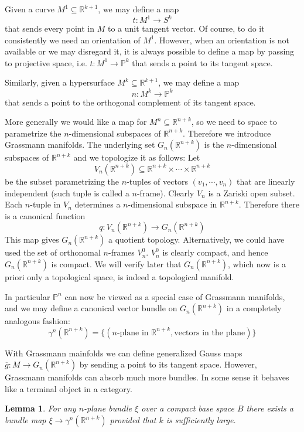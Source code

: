 \documentclass[12pt]{article}
\theoremstyle{plain}
\newtheorem{lemma}[equation]{Lemma}
\theoremstyle{definition}
\newcommand{\IP}{\mathbb{P}}
\newcommand{\IR}{\mathbb{R}}
\newcommand{\<}{\langle}
\renewcommand{\>}{\rangle}
\newcommand{\wb}{\overline}
\newcommand{\tG}{G_n(\IR^{n + k})}
\begin{document}
Given a curve $M^1 \subseteq \IR^{k + 1}$, we may define a map $$t : M^1 \to S^k$$ that sends every point in $M$ to a unit tangent vector. Of course, to do it consistently we need an orientation of $M^1$. However, when an orientation is not available or we may disregard it, it is always possible to define a map by passing to projective space, i.e. $t : M^1 \to \IP^k$ that sends a point to its tangent space. 

Similarly, given a hypersurface $M^k \subseteq \IR^{k + 1}$, we may define a map $$ n : M^k \to \IP^k$$ that sends a point to the orthogonal complement of its tangent space. 

More generally we would like a map for $M^n \subseteq \IR^{n + k}$, so we need to space to parametrize the $n$-dimensional subspaces of $\IR^{n + k}$. Therefore we introduce Grassmann manifolds. The underlying set $G_n(\IR^{n + k})$ is the $n$-dimensional subspaces of $\IR^{n + k}$ and we topologize it as follows: Let $$V_n(\IR^{n + k}) \subseteq \IR^{n + k} \times \cdots \times \IR^{n + k}$$ be the subset parametrizing the $n$-tuples of vectors $(v_1, \cdots, v_n)$ that are linearly independent (such tuple is called a $n$-frame). Clearly $V_n$ is a Zariski open subset. Each $n$-tuple in $V_n$ determines a $n$-dimensional subspace in $\IR^{n + k}$. Therefore there is a canonical function 
$$ q : V_n(\IR^{n + k}) \to G_n (\IR^{n + k}) $$ 
This map gives $G_n (\IR^{n + k})$ a quotient topology. Alternatively, we could have used the set of orthonomal $n$-frames $V^0_{n}$. $V^0_{n}$ is clearly compact, and hence $G_n (\IR^{n + k})$ is compact. We will verify later that $G_n (\IR^{n + k})$, which now is a priori only a topological space, is indeed a topological manifold. 

In particular $\IP^n$ can now be viewed as a special case of Grassmann manifolds, and we may define a canonical vector bundle on $G_n(\IR^{n + k})$ in a completely analogous fashion: $$\gamma^n(\IR^{n + k}) = \{ (\text{$n$-plane in }\IR^{n + k}, \text{vectors in the plane}) \}$$ 

With Grassmann mainfolds we can define generalized Gauss maps $\wb{g} : M \to \tG$ by sending a point to its tangent space. However, Grassmann manifolds can absorb much more bundles. In some sense it behaves like a terminal object in a category. 

\begin{lemma}
\label{complemma}
For any $n$-plane bundle $\xi$ over a compact base space $B$ there exists a bundle map $\xi \to \gamma^n(\IR^{n + k})$ provided that $k$ is sufficiently large. 
\end{lemma}
\end{document}
